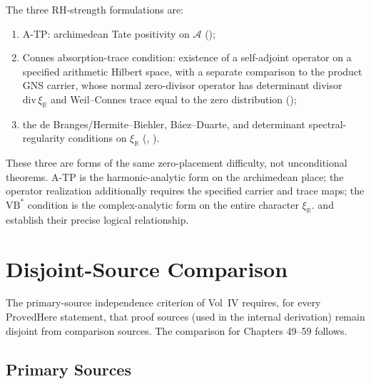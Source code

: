 \begin{remark}
\label{v4-arith:w5-synth:rem:ATP-equivalences}
The three RH-strength formulations are:
\begin{enumerate}
\item A-TP: archimedean Tate positivity on
\(\mathscr A\)
();
\item Connes absorption-trace condition: existence of a
self-adjoint operator on a specified arithmetic Hilbert space,
with a separate comparison to the product GNS carrier,
whose normal zero-divisor operator has determinant divisor
\(\mathrm{div}\,\xi_{\mathbb R}\) and Weil--Connes trace equal to the
zero distribution
();
\item the de Branges/Hermite--Biehler, B\'aez--Duarte, and
determinant spectral-regularity conditions on \(\xi_{\mathbb{R}}\)
(,
).
\end{enumerate}
These three are forms of the same zero-placement difficulty,
not unconditional theorems.
A-TP is the harmonic-analytic form on the archimedean place; the
operator realization additionally requires the specified carrier and
trace maps; the \(\mathrm{VB}^{*}\) condition is the complex-analytic form on
the entire character \(\xi_{\mathbb{R}}\).
 and
establish their precise logical relationship.
\end{remark}

\section{Disjoint-Source Comparison}
\label{v4-arith:w5-synth:disjoint-comparison}

The primary-source independence criterion of Vol~IV requires, for every
\(\mathrm{ProvedHere}\) statement, that proof sources (used
in the internal derivation) remain disjoint from
comparison sources. The comparison for Chapters 49--59 follows.

\subsection{Primary Sources}
\label{v4-arith:w5-synth:lists}

